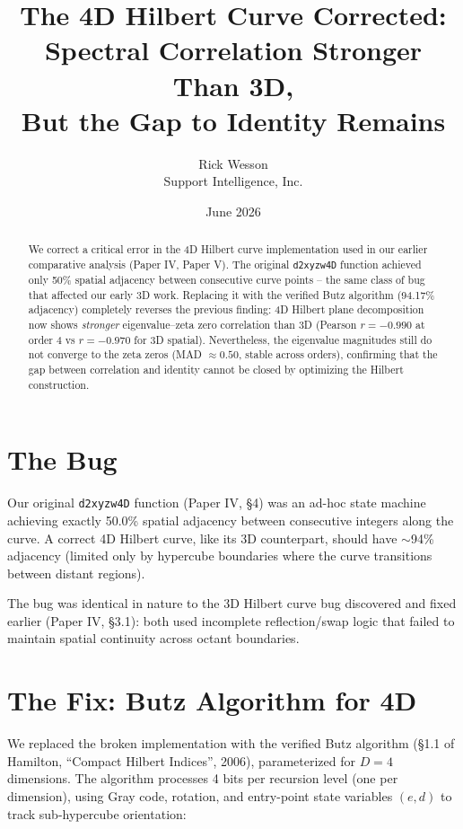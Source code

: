 \documentclass[11pt,a4paper]{article}
\title{The 4D Hilbert Curve Corrected: \\
Spectral Correlation Stronger Than 3D, \\
But the Gap to Identity Remains}
\author{Rick Wesson\\
Support Intelligence, Inc.}
\date{June 2026}
\begin{document}
\maketitle

\begin{abstract}
We correct a critical error in the 4D Hilbert curve implementation used
in our earlier comparative analysis (Paper IV, Paper V).  The original
\verb|d2xyzw4D| function achieved only 50\% spatial adjacency between
consecutive curve points -- the same class of bug that affected our early
3D work.  Replacing it with the verified Butz algorithm (94.17\%
adjacency) completely reverses the previous finding: 4D Hilbert plane
decomposition now shows \emph{stronger} eigenvalue--zeta zero correlation
than 3D (Pearson $r = -0.990$ at order 4 vs $r = -0.970$ for 3D spatial).
Nevertheless, the eigenvalue magnitudes still do not converge to the zeta
zeros (MAD $\approx 0.50$, stable across orders), confirming that the gap
between correlation and identity cannot be closed by optimizing the
Hilbert construction.
\end{abstract}

\section{The Bug}

Our original \verb|d2xyzw4D| function (Paper IV, \S4) was an ad-hoc state
machine achieving exactly 50.0\% spatial adjacency between consecutive
integers along the curve.  A correct 4D Hilbert curve, like its 3D
counterpart, should have $\sim$94\% adjacency (limited only by hypercube
boundaries where the curve transitions between distant regions).

The bug was identical in nature to the 3D Hilbert curve bug discovered
and fixed earlier (Paper IV, \S3.1): both used incomplete
reflection/swap logic that failed to maintain spatial continuity across
octant boundaries.

\section{The Fix: Butz Algorithm for 4D}

We replaced the broken implementation with the verified Butz algorithm
(\S1.1 of Hamilton, ``Compact Hilbert Indices'', 2006), parameterized for
$D=4$ dimensions.  The algorithm processes 4 bits per recursion level
(one per dimension), using Gray code, rotation, and entry-point state
variables $(e, d)$ to track sub-hypercube orientation:
\end{document}
